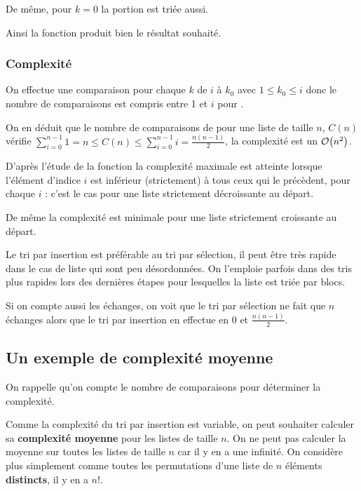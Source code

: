 De même, pour $k=0$ la portion est triée aussi.

Ainsi la fonction  produit bien le résultat souhaité.

\subsubsection{Complexité} On effectue une comparaison pour chaque $k$ de $i$ à $k_0$ avec $1\le k_0 \le i$ donc le nombre de comparaisons est compris entre 1 et $i$ pour .

On en déduit que le nombre de comparaisons de  pour une liste de taille $n$, $C(n)$ vérifie 
$\displaystyle \sum_{i=0}^{n-1} 1 = n  \le C(n) \le   \sum_{i=0}^{n-1} i = \frac{n(n-1)}2$, la complexité est un ${\cal O}\bigl(n^2\bigr)$. 

D'après l'étude de la fonction   la complexité maximale est atteinte lorsque l'élément d'indice $i$ est inférieur (strictement) à tous ceux qui le précèdent, pour chaque $i$ : c'est le cas pour une liste strictement décroissante au départ.

De même la complexité est minimale pour une liste strictement croissante au départ.

Le tri par insertion est préférable au tri par sélection, il peut être très rapide dans le cas de liste qui sont peu désordonnées. On l'emploie parfois dans des tris plus rapides lors des dernières étapes pour lesquelles la liste est triée par blocs.

Si on compte aussi les échanges, on voit que le tri par sélection ne fait que $n$ échanges alors que le tri par insertion en effectue en 0 et $\frac{n(n-1)}2$.
\newpage
\subsection{Un exemple de complexité moyenne}
On rappelle qu'on compte le nombre de comparaisons pour déterminer la complexité.

Comme la complexité du tri par insertion est variable, on peut souhaiter calculer sa {\bf complexité moyenne} pour les listes de taille $n$. On ne peut pas calculer la moyenne sur toutes les listes de taille $n$ car il y en a une infinité.
On considère plus simplement comme toutes les permutations d'une liste de $n$ éléments {\bf distincts}, il y en a $n!$.

